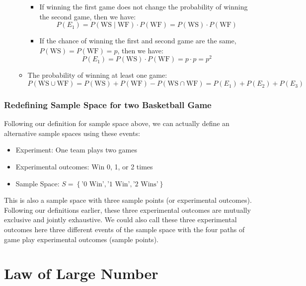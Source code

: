 \documentclass[
]{book}
\providecommand{\tightlist}{%
  \setlength{\itemsep}{0pt}\setlength{\parskip}{0pt}}
\begin{document}
\begin{itemize}
\begin{itemize}
    \begin{itemize}
    \tightlist
    \item
      If winning the first game does not change the probability of winning the second game, then we have:
      \[P(E_1) = P(\text{WS} \mid \text{WF}) \cdot P(\text{WF}) = P(\text{WS}) \cdot P(\text{WF}) \]
    \item
      If the chance of winning the first and second game are the same, \(P(\text{WS})=P(\text{WF})=p\), then we have:
      \[P(E_1) = P(\text{WS}) \cdot P(\text{WF}) = p \cdot p = p^2 \]
    \end{itemize}
  \item
    The probability of winning at least one game:
    \[P(\text{WS} \cup \text{WF}) = P(\text{WS}) +  P(\text{WF}) - P(\text{WS} \cap \text{WF}) = P(E_1) + P(E_2) + P(E_3) \]
  \end{itemize}
\end{itemize}

\hypertarget{redefining-sample-space-for-two-basketball-game}{%
\subsubsection{Redefining Sample Space for two Basketball Game}\label{redefining-sample-space-for-two-basketball-game}}

Following our definition for sample space above, we can actually define an alternative sample spaces using these events:

\begin{itemize}
\tightlist
\item
  Experiment: One team plays two games
\item
  Experimental outcomes: Win 0, 1, or 2 times
\item
  Sample Space: \(S=\left\{\text{'0 Win'}, \text{'1 Win'}, \text{'2 Wins'}\right\}\)
\end{itemize}

This is also a sample space with three sample points (or experimental outcomes). Following our definitions earlier, these three experimental outcomes are mutually exclusive and jointly exhaustive. We could also call these three experimental outcomes here three different events of the sample space with the four paths of game play experimental outcomes (sample points).

\hypertarget{law-of-large-number}{%
\section{Law of Large Number}\label{law-of-large-number}}
\end{document}
